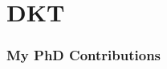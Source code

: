 \documentclass[8pt,xcolor=table]{beamer}
\begin{document}
\section{DKT}

\begin{frame}
\frametitle{My PhD Contributions}


\begin{figure}
\centering

{ 
\ovEBM 
\ovVWDPM }

\ovDKT
{ \ovTadpole

\ovPainter
}

\end{figure}

\end{frame}
\end{document}
